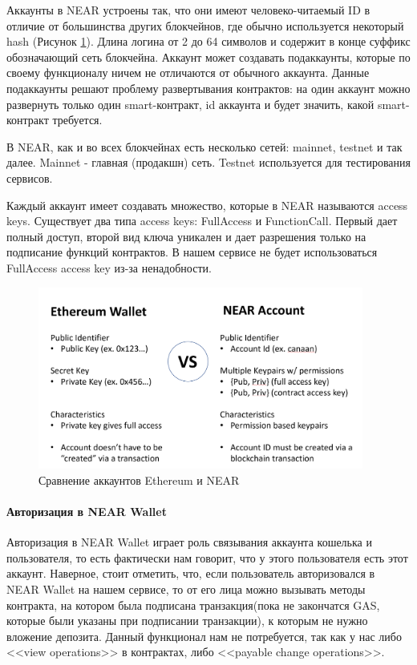 Аккаунты в NEAR\cite{nearaccounts} устроены так, что они имеют человеко-читаемый ID в отличие от большинства других блокчейнов, где обычно используется некоторый hash (Рисунок {\color{blue} \ref{fig.eth_near_cmp}}). Длина логина от 2 до 64 символов и содержит в конце суффикс обозначающий сеть блокчейна. Аккаунт может создавать подаккаунты, которые по своему функционалу ничем не отличаются от обычного аккаунта. Данные подаккаунты решают проблему развертывания контрактов: на один аккаунт можно развернуть только один smart-контракт, id аккаунта и будет значить, какой smart-контракт требуется.

\begin{definition}
    В NEAR, как и во всех блокчейнах есть несколько сетей: mainnet, testnet и так далее. Mainnet - главная (продакшн) сеть. Testnet используется для тестирования сервисов.
\end{definition}

Каждый аккаунт имеет создавать множество, которые в NEAR называются access keys. Существует два типа access keys: FullAccess и FunctionCall. Первый дает полный доступ, второй вид ключа уникален и дает разрешения только на подписание функций контрактов. В нашем сервисе не будет использоваться FullAccess access key из-за ненадобности.

\begin{figure}
    \centering
    \includegraphics[height=60mm]{fig/eth_near_cmp.png}
    \caption{Сравнение аккаунтов Ethereum и NEAR}
    \label{fig.eth_near_cmp}
\end{figure}

\paragraph{Авторизация в NEAR Wallet}

Авторизация в NEAR Wallet играет роль связывания аккаунта кошелька и пользователя, то есть фактически нам говорит, что у этого пользователя есть этот аккаунт. Наверное, стоит отметить, что, если пользователь авторизовался в NEAR Wallet на нашем сервисе, то от его лица можно вызывать методы контракта, на котором была подписана транзакция(пока не закончатся GAS, которые были указаны при подписании транзакции), к которым не нужно вложение депозита. Данный функционал нам не потребуется, так как у нас либо <<view operations>> в контрактах, либо <<payable change operations>>.

